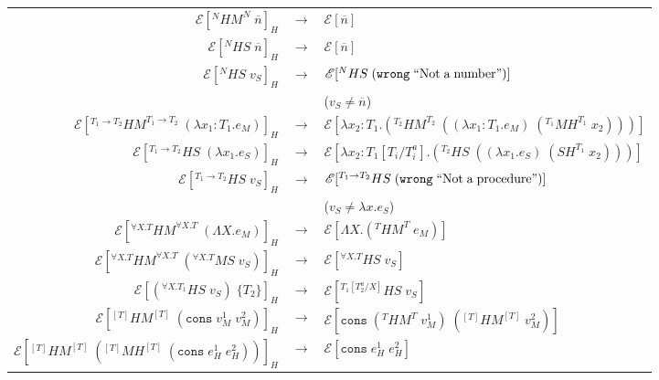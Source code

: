 \begin{figure}
\onehalfspacing
\begin{center}
\begin{tabular}{rcl}
$\mathscr{E}[^{N}HM^{N}\;\overline{n}]_{H}$ & $\rightarrow$ & $\mathscr{E}[\overline{n}]$ \\
$\mathscr{E}[^{N}HS\;\overline{n}]_{H}$ & $\rightarrow$ & $\mathscr{E}[\overline{n}]$ \\
$\mathscr{E}[^{N}HS\;v_{S}]_{H}$ & $\rightarrow$ & $\mathscr{E}[^{N}HS\;(\mathtt{wrong}\;\mathrm{``Not\;a\;number"})]$ \\
&& ($v_{S}\neq\overline{n}$) \\
$\mathscr{E}[^{T_{1}\rightarrow T_{2}}HM^{T_{1}\rightarrow T_{2}}\;(\lambda x_{1}:T_{1}.e_{M})]_{H}$ & $\rightarrow$ & $\mathscr{E}[\lambda x_{2}:T_{1}.(^{T_{2}}HM^{T_{2}}\;((\lambda x_{1}:T_{1}.e_{M})\;(^{T_{1}}MH^{T_{1}}\;x_{2})))]$ \\
$\mathscr{E}[^{T_{1}\rightarrow T_{2}}HS\;(\lambda x_{1}.e_{S})]_{H}$ & $\rightarrow$ & $\mathscr{E}[\lambda x_{2}:T_{1}[T_{i}/T^{a}_{i}].(^{T_{2}}HS\;((\lambda x_{1}.e_{S})\;(SH^{T_{1}}\;x_{2})))]$ \\
$\mathscr{E}[^{T_{1}\rightarrow T_{2}}HS\;v_{S}]_{H}$ & $\rightarrow$ & $\mathscr{E}[^{T_{1}\rightarrow T_{2}}HS\;(\mathtt{wrong}\;\mathrm{``Not\;a\;procedure"})]$ \\
&& ($v_{S}\neq\lambda x.e_{S}$) \\
$\mathscr{E}[^{\forall X.T}HM^{\forall X.T}\;(\Lambda X.e_{M})]_{H}$ & $\rightarrow$ & $\mathscr{E}[\Lambda X.(^{T}HM^{T}\;e_{M})]$ \\
$\mathscr{E}[^{\forall X.T}HM^{\forall X.T}\;(^{\forall X.T}MS\;v_{S})]_{H}$ & $\rightarrow$ & $\mathscr{E}[^{\forall X.T}HS\;v_{S}]$ \\
$\mathscr{E}[(^{\forall X.T_{1}}HS\;v_{S})\;\lbrace T_{2}\rbrace]_{H}$ & $\rightarrow$ & $\mathscr{E}[^{T_{1}[T^{a}_{2}/X]}HS\;v_{S}]$ \\
$\mathscr{E}[^{[T]}HM^{[T]}\;(\mathtt{cons}\;v_{M}^{1}\;v_{M}^{2})]_{H}$ & $\rightarrow$ & $\mathscr{E}[\mathtt{cons}\;(^{T}HM^{T}\;v_{M}^{1})\;(^{[T]}HM^{[T]}\;v_{M}^{2})]$ \\
$\mathscr{E}[^{[T]}HM^{[T]}\;(^{[T]}MH^{[T]}\;(\mathtt{cons}\;e_{H}^{1}\;e_{H}^{2}))]_{H}$ & $\rightarrow$ & $\mathscr{E}[\mathtt{cons}\;e_{H}^{1}\;e_{H}^{2}]$ \\

\end{tabular}
\end{center}
\end{figure}
